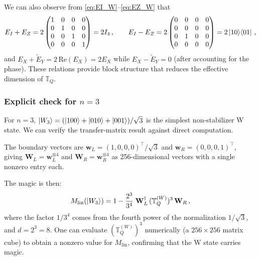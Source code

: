 \documentclass[11pt,a4paper]{article}
\theoremstyle{definition}
\theoremstyle{remark}
\newcommand{\Mlin}{M_{\mathrm{lin}}}
\begin{document}
We can also observe from \eqref{eq:EI_W}--\eqref{eq:EZ_W} that
\begin{equation}\label{eq:EP_IZ}
  E_I + E_Z = 2\begin{pmatrix}1&0&0&0\\0&1&0&0\\0&0&1&0\\0&0&0&1\end{pmatrix} = 2I_4\,,\qquad
  E_I - E_Z = 2\begin{pmatrix}0&0&0&0\\0&0&0&0\\0&1&0&0\\0&0&0&0\end{pmatrix} = 2\ket{10}\!\bra{01}\,,
\end{equation}
and $E_X + \tilde{E}_Y = 2\,\mathrm{Re}(E_X) = 2E_X$ while $E_X - \tilde{E}_Y = 0$ (after accounting for the phase).
These relations provide block structure that reduces the effective dimension of $\mathbb{T}_Q$.

\subsubsection{Explicit check for $n=3$}

For $n=3$, $\ket{W_3} = (\ket{100}+\ket{010}+\ket{001})/\sqrt{3}$ is the simplest non-stabilizer W state.  We can verify the transfer-matrix result against direct computation.

The boundary vectors are $\mathbf{w}_L = (1,0,0,0)^\top/\sqrt{3}$ and $\mathbf{w}_R = (0,0,0,1)^\top$, giving
$\mathbf{W}_L = \mathbf{w}_L^{\otimes 4}$ and $\mathbf{W}_R = \mathbf{w}_R^{\otimes 4}$ as 256-dimensional vectors with a single nonzero entry each.

The magic is then:
\begin{equation}
  \Mlin(\ket{W_3}) = 1 - \frac{2^3}{3^4}\;\mathbf{W}_L^\dagger\,(\mathbb{T}_Q^{(W)})^3\,\mathbf{W}_R\,,
\end{equation}
where the factor $1/3^4$ comes from the fourth power of the normalization $1/\sqrt{3}$, and $d=2^3=8$.
One can evaluate $(\mathbb{T}_Q^{(W)})^3$ numerically (a $256\times 256$ matrix cube) to obtain a nonzero value for $\Mlin$, confirming that the W state carries magic.
\end{document}
